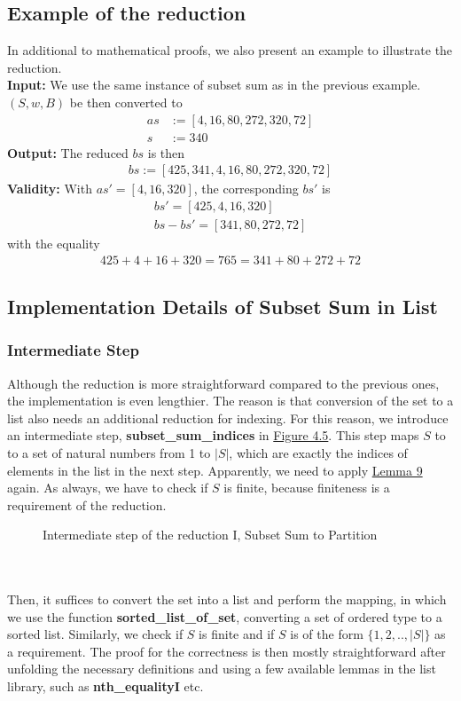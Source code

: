 \subsection{Example of the reduction}
In additional to mathematical proofs, we also present an example to illustrate the reduction.\\
\textbf{Input:} We use the same instance of subset sum as in the previous example. $(S, w, B)$ be 
then converted to 
\begin{align*}
    as &:= [4, 16, 80, 272, 320, 72] \\ 
    s &:= 340
\end{align*}
\textbf{Output:} The reduced $bs$ is then 
\begin{align*}
    bs := [425, 341, 4, 16, 80, 272, 320, 72]
\end{align*}
\textbf{Validity:} With $as' = [4, 16, 320]$, the corresponding $bs'$ is 
\begin{align*}
    bs' = [425, 4, 16, 320] \\ 
    bs - bs' = [341, 80, 272, 72]
\end{align*}
with the equality
\begin{align*}
    425 + 4 + 16 + 320 = 765 = 341 + 80 + 272 + 72 
\end{align*}

\subsection{Implementation Details of Subset Sum in List}
\subsubsection*{Intermediate Step}
Although the reduction is more straightforward compared to the previous ones, the implementation is even lengthier. 
The reason is that conversion of the set to a list also needs an additional reduction for indexing. For this reason, we introduce 
an intermediate step, \textbf{subset\_sum\_indices} in \hyperref[fig:4.5]{Figure 4.5}.
This step maps $S$ to to a set of natural numbers from 1 to $|S|$, which are exactly the indices of elements 
in the list in the next step. Apparently, we need to apply \hyperref[lemma:9]{Lemma 9} again. 
As always, we have to check if $S$ is finite, because finiteness is a requirement of the reduction.
\begin{figure}[!h]
    \caption{Intermediate step of the reduction I, Subset Sum to Partition}
    \label{fig:4.6}
\end{figure}\\\\
Then, it suffices to convert the set into a list and perform the mapping, in which we use the function 
\textbf{sorted\_list\_of\_set}, converting a set of ordered type to a sorted list. Similarly, we check if 
$S$ is finite and if $S$ is of the form $\{1, 2, .. , |S|\}$ as a requirement. The proof for the correctness is then mostly straightforward
after unfolding the necessary definitions and using a few available lemmas in the list library, such as \textbf{nth\_equalityI} etc. 

